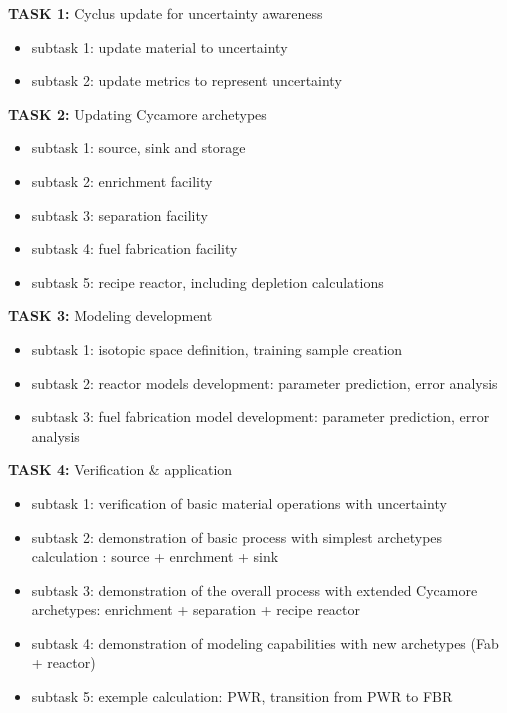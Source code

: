 \documentclass[dvips,12pt]{article}
\begin{document}
\newpage
\noindent\textbf{TASK 1:} Cyclus update for uncertainty awareness
\begin{itemize}[nosep]
\item subtask 1: update material to uncertainty
\item subtask 2: update metrics to represent uncertainty
\end{itemize}

\noindent\textbf{TASK 2:} Updating Cycamore archetypes
\begin{itemize}[nosep]
\item subtask 1: source, sink and storage
\item subtask 2: enrichment facility 
\item subtask 3: separation facility
\item subtask 4: fuel fabrication facility
\item subtask 5: recipe reactor, including depletion calculations
\end{itemize}

\noindent\textbf{TASK 3:} Modeling development
\begin{itemize}[nosep]
\item subtask 1: isotopic space definition,
  training sample creation
\item subtask 2: reactor models development:
  parameter prediction, error analysis
\item subtask 3: fuel fabrication model
  development: parameter prediction, error
  analysis
\end{itemize}
 
\noindent\textbf{TASK 4:} Verification \& application
\begin{itemize}[nosep]
\item subtask 1: verification of basic material
  operations with uncertainty
\item subtask 2: demonstration of basic process
  with simplest archetypes calculation : source +
  enrchment + sink
\item subtask 3: demonstration of the overall
  process with extended Cycamore archetypes:
  enrichment + separation + recipe reactor
\item subtask 4: demonstration of modeling
  capabilities with new archetypes (Fab + reactor)
\item subtask 5: exemple calculation: PWR,
  transition from PWR to FBR
\end{itemize}
\end{document}
